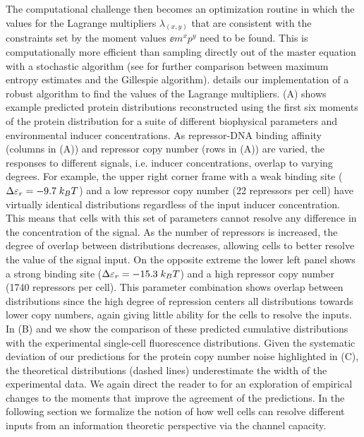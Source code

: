 The computational challenge then becomes an optimization routine in which the
values for the Lagrange multipliers $\lambda_{(x,y)}$ that are consistent with
the constraints set by the moment values $\ee{m^x p^y}$ need to be found. This
is computationally more efficient than sampling directly out of the master
equation with a stochastic algorithm (see  for further
comparison between maximum entropy estimates and the Gillespie algorithm).
 details our implementation of a robust algorithm to find
the values of the Lagrange multipliers. (A) shows example
predicted protein distributions reconstructed using the first six moments of
the protein distribution for a suite of different biophysical parameters and
environmental inducer concentrations. As repressor-DNA binding affinity
(columns in (A)) and repressor copy number (rows in
(A)) are varied, the responses to different signals, i.e.
inducer concentrations, overlap to varying degrees. For example, the upper
right corner frame with a weak binding site ($\Delta\varepsilon_r = -9.7 \; k_BT$) and a low
repressor copy number (22 repressors per cell) have virtually identical
distributions regardless of the input inducer concentration. This means that
cells with this set of parameters cannot resolve any difference in the
concentration of the signal. As the number of repressors is increased, the
degree of overlap between distributions decreases, allowing cells to better
resolve the value of the signal input. On the opposite extreme the lower left
panel shows a strong binding site ($\Delta\varepsilon_r = -15.3 \; k_BT$) and a high repressor
copy number (1740 repressors per cell). This parameter combination shows
overlap between distributions since the high degree of repression centers all
distributions towards lower copy numbers, again giving little ability for the
cells to resolve the inputs. In (B) and 
we show the comparison of these predicted cumulative distributions with the
experimental single-cell fluorescence distributions. Given the systematic
deviation of our predictions for the protein copy number noise highlighted in
(C), the theoretical distributions (dashed lines)
underestimate the width of the experimental data. We again direct the reader to
 for an exploration of empirical changes to the moments
that improve the agreement of the predictions. In the following section we
formalize the notion of how well cells can resolve different inputs from an
information theoretic perspective via the channel capacity.

